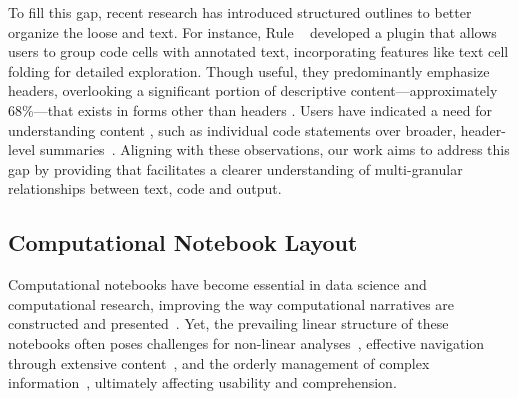 To fill this gap, recent research has introduced structured outlines to better organize the loose  and text. 
For instance, Rule \etal~\cite{rule2018aiding} developed a plugin that allows users to group code cells with annotated text, incorporating features like text cell folding for detailed exploration. 
Though useful, they predominantly emphasize headers, overlooking a significant portion of descriptive content—approximately 68\%—that exists in forms other than headers \cite{wang2022documentation}. 
Users have indicated a need for understanding content , such as individual code statements over broader, header-level summaries~\cite{chattopadhyay2023make}. 
Aligning with these observations, our work aims to address this gap by providing  that facilitates a clearer understanding of multi-granular relationships between text, code and output.








\subsection{Computational Notebook Layout}
\label{sec:layout}

Computational notebooks have become essential in data science and computational research, improving the way computational narratives are constructed and presented~\cite{rule2018exploration}.
Yet, the prevailing linear structure of these notebooks often poses challenges for non-linear analyses~\cite{wang2022stickyland, weinman2021fork}, effective navigation through extensive content~\cite{harden2022exploring}, and the orderly management of complex information~\cite{head2019managing, liu2019understanding, shankar2022bolt}, ultimately affecting usability and comprehension.


